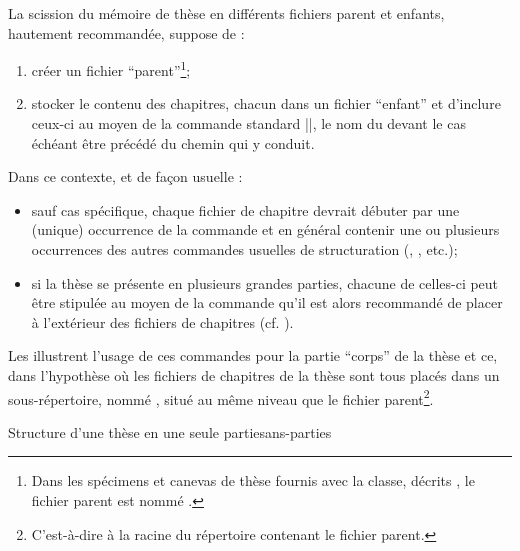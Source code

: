 La scission du mémoire de thèse en différents fichiers parent et enfants,
hautement recommandée, suppose de :
\begin{enumerate}
\item créer un fichier \enquote{parent}\footnote{Dans les spécimens et canevas
    de thèse fournis avec la classe, décrits , le
    fichier parent est nommé .};
\item stocker le contenu des chapitres, chacun dans un fichier
  \enquote{enfant}
  et d'inclure ceux-ci au moyen de la commande
  standard ||, le nom du  devant le cas échéant être précédé du chemin qui y
  conduit.
\end{enumerate}
%
Dans ce contexte, et de façon usuelle :
\begin{itemize}
\item sauf cas spécifique, chaque fichier de chapitre devrait débuter par une
  (unique) occurrence de la commande  et en général
  contenir une ou plusieurs occurrences des autres commandes usuelles de
  structuration (, , etc.);
\item si la thèse se présente en plusieurs grandes parties, chacune
  de celles-ci peut être stipulée au moyen de la commande
   qu'il est alors recommandé de placer à
  l'extérieur des fichiers de chapitres (cf.
  ).
\end{itemize}
%
Les  illustrent l'usage de
ces commandes pour la partie \enquote{corps} de la thèse et ce, dans l'hypothèse
où les fichiers de chapitres de la thèse sont tous placés dans un
sous-répertoire, nommé , situé au même niveau que le fichier
parent\footnote{C'est-à-dire à la racine du répertoire contenant le fichier
  parent.}.
\begin{dbexample}{Structure d'une thèse en une seule partie}{sans-parties}
\begin{bodycode}
"}
"}
...
"}
"}
\end{bodycode}
\end{dbexample}

